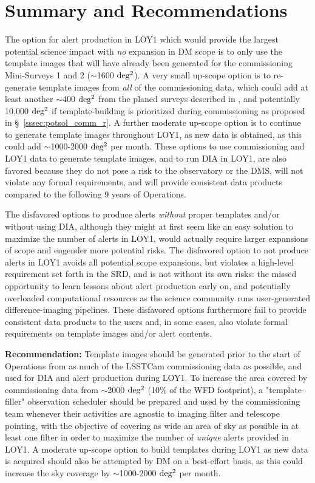 \documentclass[DM,lsstdraft,toc]{lsstdoc}
\begin{document}
\clearpage
\section{Summary and Recommendations}\label{sec:rec}

The option for alert production in LOY1 which would provide the largest potential science impact with {\em no} expansion in DM scope is to only use the template images that will have already been generated for the commissioning Mini-Surveys 1 and 2 ($\sim$1600 $\rm deg^2$). A very small up-scope option is to re-generate template images from {\em all} of the commissioning data, which could add at least another $\sim$400 $\rm deg^2$ from the planed surveys described in , and potentially 10,000 $\rm deg^2$ if template-building is prioritized during commissioning as proposed in \S~\ref{sssec:potsol_comm_r}. A further moderate up-scope option is to continue to generate template images throughout LOY1, as new data is obtained, as this could add $\sim$1000-2000 $\rm deg^2$ per month. These options to use commissioning and LOY1 data to generate template images, and to run DIA in LOY1, are also favored because they do not pose a risk to the observatory or the DMS, will not violate any formal requirements, and will provide consistent data products compared to the following 9 years of Operations. 

The disfavored options to produce alerts {\it without} proper templates and/or without using DIA, although they might at first seem like an easy solution to maximize the number of alerts in LOY1, would actually require larger expansions of scope and engender more potential risks. The disfavored option to not produce alerts in LOY1 avoids all potential scope expansions, but violates a high-level requirement set forth in the SRD, and is not without its own risks: the missed opportunity to learn lessons about alert production early on, and potentially overloaded computational resources as the science community runs user-generated difference-imaging pipelines. These disfavored options furthermore fail to provide consistent data products to the users and, in some cases, also violate formal requirements on template images and/or alert contents.

{\bf Recommendation:} Template images should be generated prior to the start of Operations from as much of the LSSTCam commissioning data as possible, and used for DIA and alert production during LOY1. To increase the area covered by commissioning data from $\sim$2000 $\rm deg^2$ (10\% of the WFD footprint), a "template-filler" observation scheduler should be prepared and used by the commissioning team whenever their activities are agnostic to imaging filter and telescope pointing, with the objective of covering as wide an area of sky as possible in at least one filter in order to maximize the number of {\em unique} alerts provided in LOY1. A moderate up-scope option to build templates during LOY1 as new data is acquired should also be attempted by DM on a best-effort basis, as this could increase the sky coverage by $\sim$1000-2000 $\rm deg^2$ per month.

\clearpage





\end{document}
